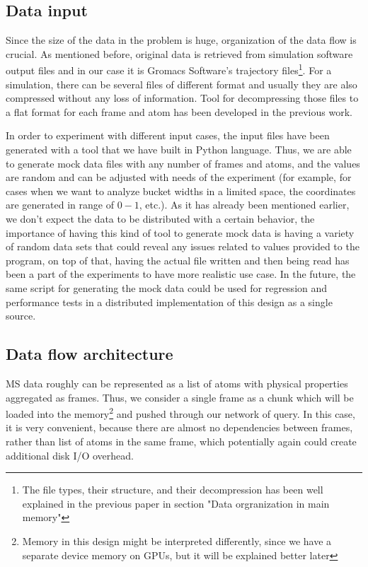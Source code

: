 \documentclass[10pt,journal,final,letterpaper,twocolumn]{IEEEtran}
\begin{document}
\subsection{Data input}
Since the size of the data in the problem is huge, organization of the data flow is crucial. As mentioned before, original data is retrieved from simulation software output files and in our case it is Gromacs Software's trajectory files\footnote{The file types, their structure, and their decompression has been well explained in the previous paper in section "Data orgranization in main memory"}. For a simulation, there can be several files of different format and usually they are also compressed without any loss of information. Tool for decompressing those files to a flat format for each frame and atom has been developed in the previous work\cite{mainPaper}. 

In order to experiment with different input cases, the input files have been generated with a tool that we have built in Python language. Thus, we are able to generate mock data files with any number of frames and atoms, and the values are random and can be adjusted with needs of the experiment (for example, for cases when we want to analyze bucket widths in a limited space, the coordinates are generated in range of $0 - 1$, etc.). As it has already been mentioned earlier, we don't expect the data to be distributed with a certain behavior, the importance of having this kind of tool to generate mock data is having a variety of random data sets that could reveal any issues related to values provided to the program, on top of that, having the actual file written and then being read has been a part of the experiments to have more realistic use case. In the future, the same script for generating the mock data could be used for regression and performance tests in a distributed implementation of this design as a single source.

\subsection{Data flow architecture}

MS data roughly can be represented as a list of atoms with physical properties aggregated as frames. Thus, we consider a single frame as a chunk which will be loaded into the memory\footnote{Memory in this design might be interpreted differently, since we have a separate device memory on GPUs, but it will be explained better later} and pushed through our network of query. In this case, it is very convenient, because there are almost no dependencies between frames, rather than list of atoms in the same frame, which potentially again could create additional disk I/O overhead.
\end{document}
